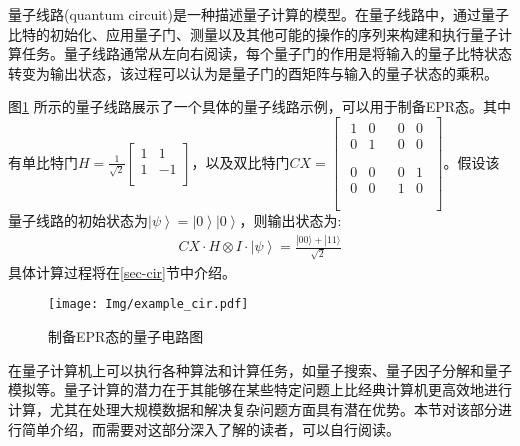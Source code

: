 量子线路(quantum circuit)是一种描述量子计算的模型。在量子线路中，通过量子比特的初始化、应用量子门、测量以及其他可能的操作的序列来构建和执行量子计算任务。量子线路通常从左向右阅读，每个量子门的作用是将输入的量子比特状态转变为输出状态，该过程可以认为是量子门的酉矩阵与输入的量子状态的乘积。
\begin{example}
    \label{ex-epr}
    图\ref{fig:example_cir} 所示的量子线路展示了一个具体的量子线路示例，可以用于制备EPR态。其中有单比特门\(H=\frac{1}{\sqrt2}\left[\begin{matrix}1&1\\1&-1\\\end{matrix}\right]\)，以及双比特门\(CX=\left[\begin{matrix}\begin{matrix}1&0\\0&1\\\end{matrix}&\begin{matrix}0&0\\0&0\\\end{matrix}\\\begin{matrix}0&0\\0&0\\\end{matrix}&\begin{matrix}0&1\\1&0\\\end{matrix}\\\end{matrix}\right]\)。假设该量子线路的初始状态为\(\left|\psi\right\rangle=\left|0\right\rangle\left|0\right\rangle\)，则输出状态为:
\begin{align}
   CX\cdot H\otimes I \cdot \left|\psi\right\rangle = \frac{|00\rangle+|11\rangle}{\sqrt{2}}
\end{align}
具体计算过程将在\ref{sec-cir}节中介绍。
\end{example}
\begin{figure}[!htbp]
    \centering
    \texttt{[image: Img/example\_cir.pdf]}
    \caption{制备EPR态的量子电路图}
    \label{fig:example_cir}
\end{figure}



在量子计算机上可以执行各种算法和计算任务，如量子搜索\citep{Grover_1996}、量子因子分解\citep{Shor}和量子模拟\citep{Feynman}等。量子计算的潜力在于其能够在某些特定问题上比经典计算机更高效地进行计算，尤其在处理大规模数据和解决复杂问题方面具有潜在优势。本节对该部分进行简单介绍，而需要对这部分深入了解的读者，可以自行阅读\citep{nielsen2010quantum}。

